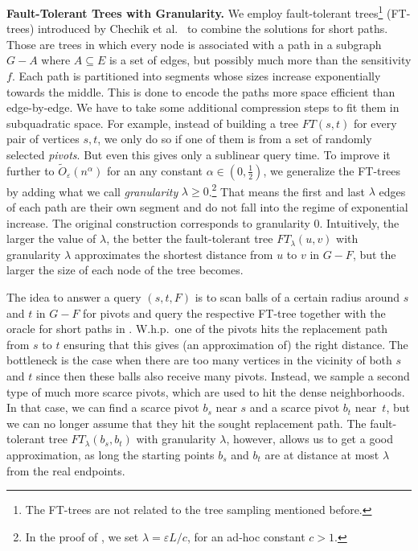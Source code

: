 \documentclass{theoretics}
\newcommand*{\Otilde}{\widetilde{O}}
\renewcommand{\ge}{\geqslant}
\newcommand{\eps}{\varepsilon}
\begin{document}
\noindent
\textbf{Fault-Tolerant Trees with Granularity.}
We employ fault-tolerant trees\footnote{%
  The FT-trees are not related to the tree sampling mentioned before.
}
(FT-trees) introduced by Chechik et al.~\cite{ChCoFiKa17}
to combine the solutions for short paths.
Those are trees in which every node is associated with a path in a subgraph
$G-A$ where $A \subseteq E$ is a set of edges, but possibly much more than the sensitivity $f$.
Each path is partitioned into segments whose sizes increase exponentially towards the middle.
This is done to encode the paths more space efficient than edge-by-edge.
We have to take some additional compression steps to fit them in subquadratic space.
For example, instead of building a tree $FT(s,t)$ for every pair of vertices $s,t$,
we only do so if one of them is from a set of randomly selected \emph{pivots}.
But even this gives only a sublinear query time.
To improve it further to $\Otilde_\eps(n^\alpha)$ 
for an any constant $\alpha \in (0,\frac{1}{2})$,
we generalize the FT-trees by adding what we call \emph{granularity} $\lambda \ge 0$.\footnote{%
	In the proof of ,
	we set $\lambda = \eps L/c$, for an ad-hoc constant $c > 1$.
}
That means the first and last $\lambda$ edges of each path are their own segment
and do not fall into the regime of exponential increase.
The original construction \cite{ChCoFiKa17} corresponds to granularity $0$.
Intuitively, the larger the value of $\lambda$, the better the fault-tolerant tree $FT_\lambda(u,v)$ with granularity $\lambda$ approximates the shortest distance from $u$ to $v$ in $G-F$, but the larger the size of each node of the tree becomes.

The idea to answer a query $(s,t,F)$ is to scan balls of a certain radius around
$s$ and $t$ in $G-F$ for pivots and query the respective FT-tree together with
the oracle for short paths in .
W.h.p.\ one of the pivots hits the replacement path from $s$ to $t$ ensuring
that this gives (an approximation of) the right distance.
The bottleneck is the case when there are too many vertices in the vicinity of both $s$ and $t$
since then these balls also receive many pivots.
Instead, we sample a second type of much more scarce pivots, 
which are used to hit the dense neighborhoods.
In that case, we can find a scarce pivot $b_s$ near $s$ and a scarce pivot $b_t$ near~$t$, 
but we can no longer assume that they hit the sought replacement path.
The fault-tolerant tree $FT_\lambda(b_s, b_t)$ with granularity $\lambda$, however,
allows us to get a good approximation,
as long the starting points $b_s$ and $b_t$ are at distance at most $\lambda$
from the real endpoints. 
\end{document}
